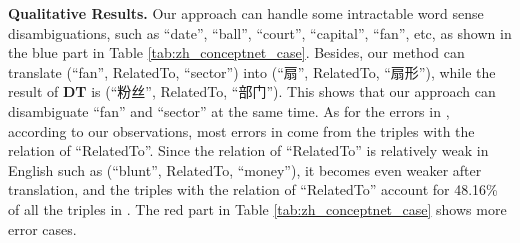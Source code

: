\textbf{Qualitative Results.}
Our approach can handle some intractable word sense disambiguations, such as ``date'', ``ball'', ``court'', ``capital'', ``fan'', etc, as shown in the blue part in Table \ref{tab:zh_conceptnet_case}.
Besides, our method can translate (``fan'', RelatedTo, ``sector'') into (``扇'', RelatedTo, ``扇形''), while the result of \textbf{DT} is (``粉丝'', RelatedTo, ``部门''). This shows that our approach can disambiguate ``fan''  and ``sector'' at the same time. As for the errors in \zhcon, according to our observations, most errors in \zhcon come from the triples with the relation of ``RelatedTo''. Since the relation of ``RelatedTo'' is relatively weak in English such as (``blunt'', RelatedTo, ``money''), it becomes even weaker after translation, and the triples with the relation of ``RelatedTo'' account for 48.16\% of all the triples in \con. The red part in Table \ref{tab:zh_conceptnet_case} shows more error cases. 


